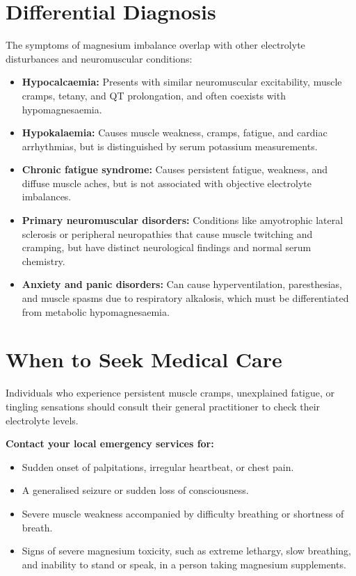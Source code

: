 \section*{Differential Diagnosis}
The symptoms of magnesium imbalance overlap with other electrolyte disturbances and neuromuscular conditions:
\begin{itemize}
    \item \textbf{Hypocalcaemia:} Presents with similar neuromuscular excitability, muscle cramps, tetany, and QT prolongation, and often coexists with hypomagnesaemia.
    \item \textbf{Hypokalaemia:} Causes muscle weakness, cramps, fatigue, and cardiac arrhythmias, but is distinguished by serum potassium measurements.
    \item \textbf{Chronic fatigue syndrome:} Causes persistent fatigue, weakness, and diffuse muscle aches, but is not associated with objective electrolyte imbalances.
    \item \textbf{Primary neuromuscular disorders:} Conditions like amyotrophic lateral sclerosis or peripheral neuropathies that cause muscle twitching and cramping, but have distinct neurological findings and normal serum chemistry.
    \item \textbf{Anxiety and panic disorders:} Can cause hyperventilation, paresthesias, and muscle spasms due to respiratory alkalosis, which must be differentiated from metabolic hypomagnesaemia.
\end{itemize}

\section*{When to Seek Medical Care}
Individuals who experience persistent muscle cramps, unexplained fatigue, or tingling sensations should consult their general practitioner to check their electrolyte levels.

\textbf{Contact your local emergency services for:}
\begin{itemize}
    \item Sudden onset of palpitations, irregular heartbeat, or chest pain.
    \item A generalised seizure or sudden loss of consciousness.
    \item Severe muscle weakness accompanied by difficulty breathing or shortness of breath.
    \item Signs of severe magnesium toxicity, such as extreme lethargy, slow breathing, and inability to stand or speak, in a person taking magnesium supplements.
\end{itemize}


